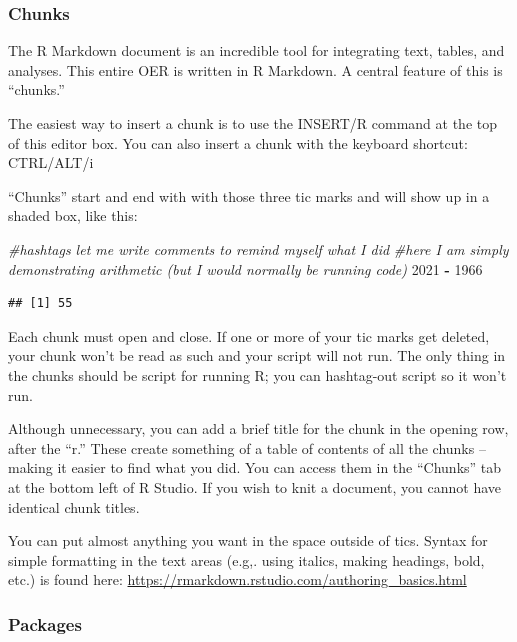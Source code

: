 \documentclass[
  english,
]{book}
\newenvironment{Shaded}{\begin{snugshade}}{\end{snugshade}}
\newcommand{\CommentTok}[1]{\textcolor[rgb]{0.56,0.35,0.01}{\textit{#1}}}
\newcommand{\DecValTok}[1]{\textcolor[rgb]{0.00,0.00,0.81}{#1}}
\newcommand{\OperatorTok}[1]{\textcolor[rgb]{0.81,0.36,0.00}{\textbf{#1}}}
\newcommand{\StringTok}[1]{\textcolor[rgb]{0.31,0.60,0.02}{#1}}
\begin{document}
\hypertarget{chunks}{%
\subsubsection{Chunks}\label{chunks}}

The R Markdown document is an incredible tool for integrating text, tables, and analyses. This entire OER is written in R Markdown. A central feature of this is ``chunks.''

The easiest way to insert a chunk is to use the INSERT/R command at the top of this editor box. You can also insert a chunk with the keyboard shortcut: CTRL/ALT/i

``Chunks'' start and end with with those three tic marks and will show up in a shaded box, like this:

\begin{Shaded}
\begin{Highlighting}[]
\CommentTok{#hashtags let me write comments to remind myself what I did}
\CommentTok{#here I am simply demonstrating arithmetic (but I would normally be running code)}
\DecValTok{2021} \OperatorTok{-}\StringTok{ }\DecValTok{1966}
\end{Highlighting}
\end{Shaded}

\begin{verbatim}
## [1] 55
\end{verbatim}

Each chunk must open and close. If one or more of your tic marks get deleted, your chunk won't be read as such and your script will not run. The only thing in the chunks should be script for running R; you can hashtag-out script so it won't run.

Although unnecessary, you can add a brief title for the chunk in the opening row, after the ``r.'' These create something of a table of contents of all the chunks -- making it easier to find what you did. You can access them in the ``Chunks'' tab at the bottom left of R Studio. If you wish to knit a document, you cannot have identical chunk titles.

You can put almost anything you want in the space outside of tics. Syntax for simple formatting in the text areas (e.g,. using italics, making headings, bold, etc.) is found here: \url{https://rmarkdown.rstudio.com/authoring_basics.html}

\hypertarget{packages}{%
\subsubsection{Packages}\label{packages}}
\end{document}
